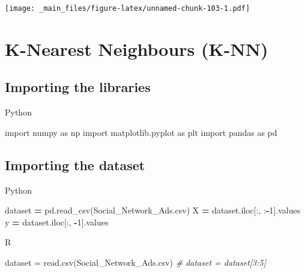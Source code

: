 \documentclass[
]{book}
\newenvironment{Shaded}{\begin{snugshade}}{\end{snugshade}}
\newcommand{\CommentTok}[1]{\textcolor[rgb]{0.56,0.35,0.01}{\textit{#1}}}
\newcommand{\DecValTok}[1]{\textcolor[rgb]{0.00,0.00,0.81}{#1}}
\newcommand{\FunctionTok}[1]{\textcolor[rgb]{0.00,0.00,0.00}{#1}}
\newcommand{\ImportTok}[1]{#1}
\newcommand{\NormalTok}[1]{#1}
\newcommand{\OperatorTok}[1]{\textcolor[rgb]{0.81,0.36,0.00}{\textbf{#1}}}
\newcommand{\OtherTok}[1]{\textcolor[rgb]{0.56,0.35,0.01}{#1}}
\newcommand{\StringTok}[1]{\textcolor[rgb]{0.31,0.60,0.02}{#1}}
\theoremstyle{definition}
\theoremstyle{definition}
\theoremstyle{definition}
\theoremstyle{definition}
\theoremstyle{remark}
\begin{document}
\texttt{[image: \_main\_files/figure-latex/unnamed-chunk-103-1.pdf]}

\hypertarget{k-nearest-neighbours-k-nn}{%
\section{K-Nearest Neighbours (K-NN)}\label{k-nearest-neighbours-k-nn}}

\hypertarget{importing-the-libraries-8}{%
\subsection{Importing the libraries}\label{importing-the-libraries-8}}

Python

\begin{Shaded}
\begin{Highlighting}[]
\ImportTok{import}\NormalTok{ numpy }\ImportTok{as}\NormalTok{ np}
\ImportTok{import}\NormalTok{ matplotlib.pyplot }\ImportTok{as}\NormalTok{ plt}
\ImportTok{import}\NormalTok{ pandas }\ImportTok{as}\NormalTok{ pd}
\end{Highlighting}
\end{Shaded}

\hypertarget{importing-the-dataset-8}{%
\subsection{Importing the dataset}\label{importing-the-dataset-8}}

Python

\begin{Shaded}
\begin{Highlighting}[]
\NormalTok{dataset }\OperatorTok{=}\NormalTok{ pd.read\_csv(}\StringTok{\textquotesingle{}Social\_Network\_Ads.csv\textquotesingle{}}\NormalTok{)}
\NormalTok{X }\OperatorTok{=}\NormalTok{ dataset.iloc[:, :}\OperatorTok{{-}}\DecValTok{1}\NormalTok{].values}
\NormalTok{y }\OperatorTok{=}\NormalTok{ dataset.iloc[:, }\OperatorTok{{-}}\DecValTok{1}\NormalTok{].values}
\end{Highlighting}
\end{Shaded}

R

\begin{Shaded}
\begin{Highlighting}[]
\NormalTok{dataset }\OtherTok{=} \FunctionTok{read.csv}\NormalTok{(}\StringTok{\textquotesingle{}Social\_Network\_Ads.csv\textquotesingle{}}\NormalTok{)}
\CommentTok{\# dataset = dataset[3:5]}
\end{Highlighting}
\end{Shaded}
\end{document}
